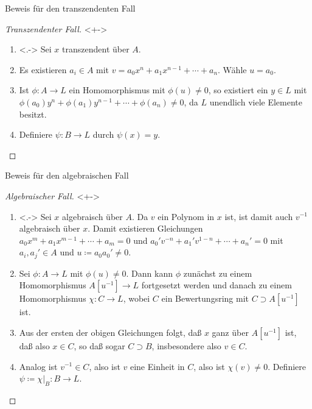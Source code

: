 \begin{frame}{Beweis für den transzendenten Fall}
	\begin{proof}[Transzendenter Fall]<+->
		\begin{enumerate}[<+->]
		\item<.->
			Sei \(x\) transzendent über \(A\).	
		\item
			Es existieren \(a_i \in A\) mit \(v = a_0 x^n + a_1 x^{n - 1} +
			\dotsb + a_n\). Wähle \(u = a_0\).
		\item
			Ist \(\phi\colon A \to L\) ein Homomorphismus mit
			\(\phi(u) \neq 0\), so existiert
			ein \(y \in L\) mit \(\phi(a_0) y^n + \phi(a_1) y^{n - 1} + \dotsb +
			\phi(a_n) \neq 0\), da \(L\) unendlich viele Elemente besitzt.
		\item
			Definiere \(\psi\colon B \to L\) durch \(\psi(x) = y\).
			\renewcommand\qedsymbol{}
			\qedhere
		\end{enumerate}
	\end{proof}
\end{frame}

\begin{frame}{Beweis für den algebraischen Fall}
	\begin{proof}[Algebraischer Fall]<+->
		\begin{enumerate}[<+->]
		\item<.->
			Sei \(x\) algebraisch über \(A\). Da \(v\) ein Polynom in \(x\)
			ist, ist damit auch \(v^{-1}\) algebraisch über \(x\). Damit
			existieren Gleichungen \(a_0 x^m + a_1 x^{m - 1} + \dotsb
			+ a_m = 0\) und \(a_0' v^{-n} + a_1' v^{1 - n} + \dotsb
			+ a_n' = 0\) mit \(a_i, a_j' \in A\) und \(u \coloneqq a_0 a_0'
			\neq 0\). 
		\item
			Sei \(\phi\colon A \to L\) mit \(\phi(u) \neq 0\). Dann kann
			\(\phi\) zunächst zu einem Homomorphismus \(A[u^{-1}] \to L\)
			fortgesetzt werden und danach zu einem Homomorphismus \(\chi\colon
			C \to L\), wobei \(C\) ein Bewertungsring mit
			\(C \supset A[u^{-1}]\) ist. 
		\item
			Aus der ersten der obigen Gleichungen folgt, daß \(x\) ganz über
			\(A[u^{-1}]\) ist, daß also \(x \in C\), so daß sogar \(C \supset
			B\), insbesondere also \(v \in C\).
		\item
			Analog ist \(v^{-1} \in C\), also ist \(v\) eine Einheit in \(C\),
			also ist \(\chi(v) \neq 0\). Definiere \(\psi\coloneqq \chi|_B\colon B \to L\).
			\qedhere
		\end{enumerate}
	\end{proof}
\end{frame}


